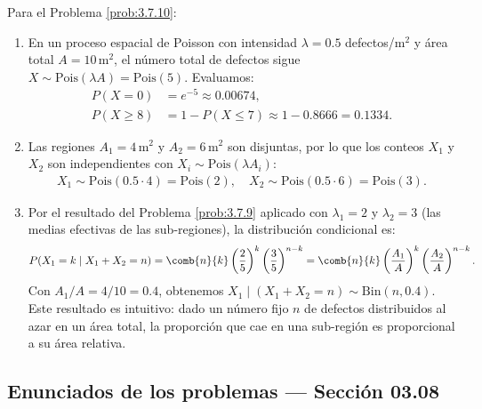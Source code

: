 \begin{solucion}
	\label{sol:3.7.10}
	Para el Problema \ref{prob:3.7.10}:
	\begin{enumerate}
		\item En un proceso espacial de Poisson con intensidad $\lambda = 0.5$ defectos/$\text{m}^{2}$ y área total $A = 10\,\text{m}^{2}$, el número total de defectos sigue $X \sim \text{Pois}(\lambda A) = \text{Pois}(5)$. Evaluamos:
		\begin{align*}
			P(X = 0) &= e^{-5} \approx 0.00674, \\
			P(X \ge 8) &= 1 - P(X \le 7) \approx 1 - 0.8666 = 0.1334.
		\end{align*}
		\item Las regiones $A_{1} = 4\,\text{m}^{2}$ y $A_{2} = 6\,\text{m}^{2}$ son disjuntas, por lo que los conteos $X_{1}$ y $X_{2}$ son independientes con $X_{i} \sim \text{Pois}(\lambda A_{i})$:
		\begin{align*}
			X_{1} \sim \text{Pois}(0.5 \cdot 4) = \text{Pois}(2), \quad X_{2} \sim \text{Pois}(0.5 \cdot 6) = \text{Pois}(3).
		\end{align*}
		\item Por el resultado del Problema \ref{prob:3.7.9} aplicado con $\lambda_{1} = 2$ y $\lambda_{2} = 3$ (las medias efectivas de las sub-regiones), la distribución condicional es:
		\begin{align*}
			P(X_{1} = k \mid X_{1} + X_{2} = n) = \comb{n}{k} \left(\dfrac{2}{5}\right)^{k} \left(\dfrac{3}{5}\right)^{n-k} = \comb{n}{k} \left(\dfrac{A_{1}}{A}\right)^{k} \left(\dfrac{A_{2}}{A}\right)^{n-k}.
		\end{align*}
		Con $A_{1}/A = 4/10 = 0.4$, obtenemos $X_{1} \mid (X_{1} + X_{2} = n) \sim \text{Bin}(n, 0.4)$. Este resultado es intuitivo: dado un número fijo $n$ de defectos distribuidos al azar en un área total, la proporción que cae en una sub-región es proporcional a su área relativa. \qedhere
	\end{enumerate}
\end{solucion}


\subsection*{Enunciados de los problemas --- Sección 03.08}


